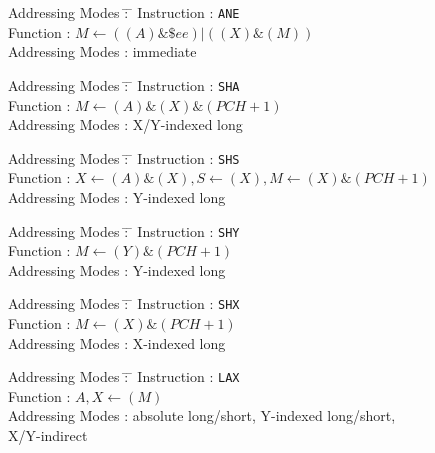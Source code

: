 \documentclass[12pt,twoside]{report}
\newcommand{\tty}[1]{{\tt #1}}
\begin{document}
\begin{tabbing}
Addressing Modes \= : \= \kill 
Instruction      \> : \> \tty{ANE} \\
Function         \> : \> $M\leftarrow((A)\&\$ee)|((X)\&(M))$ \\
Addressing Modes \> : \> immediate \\
\end{tabbing}

\begin{tabbing}
Addressing Modes \= : \= \kill 
Instruction      \> : \> \tty{SHA} \\
Function         \> : \> $M\leftarrow(A)\&(X)\&(PCH+1)$ \\
Addressing Modes \> : \> X/Y-indexed long \\
\end{tabbing}

\begin{tabbing}
Addressing Modes \= : \= \kill 
Instruction      \> : \> \tty{SHS} \\
Function         \> : \> $X\leftarrow(A)\&(X), S\leftarrow(X), M\leftarrow(X)\&(PCH+1)$ \\
Addressing Modes \> : \> Y-indexed long \\
\end{tabbing}

\begin{tabbing}
Addressing Modes \= : \= \kill 
Instruction      \> : \> \tty{SHY} \\
Function         \> : \> $M\leftarrow(Y)\&(PCH+1)$ \\
Addressing Modes \> : \> Y-indexed long \\
\end{tabbing}

\begin{tabbing}
Addressing Modes \= : \= \kill 
Instruction      \> : \> \tty{SHX} \\
Function         \> : \> $M\leftarrow(X)\&(PCH+1)$ \\
Addressing Modes \> : \> X-indexed long \\
\end{tabbing}

\begin{tabbing}
Addressing Modes \= : \= \kill 
Instruction      \> : \> \tty{LAX} \\
Function         \> : \> $A,X\leftarrow(M)$ \\
Addressing Modes \> : \> absolute long/short, Y-indexed long/short, \\
                 \>   \> X/Y-indirect \\
\end{tabbing}
\end{document}
